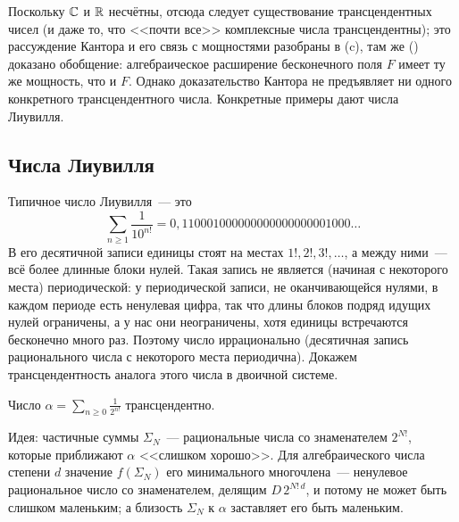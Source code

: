 Поскольку $\mathbb C$ и $\mathbb R$ несчётны, отсюда следует существование трансцендентных чисел (и даже то, что <<почти все>>
комплексные числа трансцендентны); это рассуждение Кантора и его связь с мощностями разобраны в (c), там же
() доказано обобщение: алгебраическое расширение бесконечного поля $F$ имеет ту же мощность, что и $F$. Однако
доказательство Кантора не предъявляет ни одного конкретного трансцендентного числа. Конкретные примеры дают числа Лиувилля.

\subsection*{Числа Лиувилля}

Типичное число Лиувилля~--- это
\[
\sum_{n\ge1}\frac{1}{10^{n!}}=0{,}110001000000000000000001000\ldots
\]
В его десятичной записи единицы стоят на местах $1!,2!,3!,\dots$, а между ними~--- всё более длинные блоки нулей. Такая запись не является (начиная с некоторого места) периодической: у периодической записи, не
оканчивающейся нулями, в каждом периоде есть ненулевая цифра, так что длины блоков подряд идущих нулей ограничены, а у
нас они неограничены, хотя единицы встречаются бесконечно много раз. Поэтому число иррационально (десятичная запись рационального числа с некоторого места периодична). Докажем трансцендентность аналога этого числа в двоичной системе.

\begin{theorem}[1.34]
Число $\displaystyle\alpha=\sum_{n\ge0}\frac{1}{2^{n!}}$ трансцендентно.
\end{theorem}

Идея: частичные суммы $\Sigma_N$~--- рациональные числа со знаменателем $2^{N!}$, которые приближают $\alpha$ <<слишком
хорошо>>. Для алгебраического числа степени $d$ значение $f(\Sigma_N)$ его минимального многочлена~--- ненулевое
рациональное число со знаменателем, делящим $D\,2^{N!\,d}$, и потому не может быть слишком маленьким; а близость $\Sigma_N$ к
$\alpha$ заставляет его быть маленьким.

